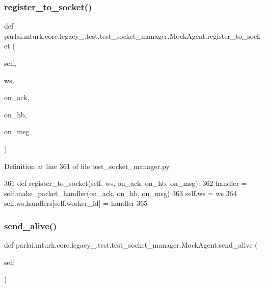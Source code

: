 \subsubsection{\texorpdfstring{register\+\_\+to\+\_\+socket()}{register\_to\_socket()}}
{\footnotesize\ttfamily def parlai.\+mturk.\+core.\+legacy\+\_.\+test.\+test\+\_\+socket\+\_\+manager.\+Mock\+Agent.\+register\+\_\+to\+\_\+socket (\begin{DoxyParamCaption}\item[{}]{self,  }\item[{}]{ws,  }\item[{}]{on\+\_\+ack,  }\item[{}]{on\+\_\+hb,  }\item[{}]{on\+\_\+msg }\end{DoxyParamCaption})}



Definition at line 361 of file test\+\_\+socket\+\_\+manager.\+py.


\begin{DoxyCode}
361     \textcolor{keyword}{def }register\_to\_socket(self, ws, on\_ack, on\_hb, on\_msg):
362         handler = self.make\_packet\_handler(on\_ack, on\_hb, on\_msg)
363         self.ws = ws
364         self.ws.handlers[self.worker\_id] = handler
365 
\end{DoxyCode}
\mbox{\label{classparlai_1_1mturk_1_1core_1_1legacy__2018_1_1test_1_1test__socket__manager_1_1MockAgent_af4be545b2b35cd69f008d19e6c1b0f83}} 
\subsubsection{\texorpdfstring{send\+\_\+alive()}{send\_alive()}}
{\footnotesize\ttfamily def parlai.\+mturk.\+core.\+legacy\+\_.\+test.\+test\+\_\+socket\+\_\+manager.\+Mock\+Agent.\+send\+\_\+alive (\begin{DoxyParamCaption}\item[{}]{self }\end{DoxyParamCaption})}



